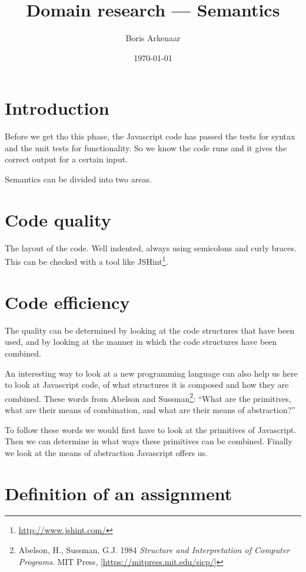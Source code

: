 \documentclass{article}
\begin{document}
 

\title{Domain research --- Semantics}
\author{Boris Arkenaar}
\date{\today}
\maketitle 

\section{Introduction} 

Before we get tho this phase, the Javascript code has passed the tests for
syntax and the unit tests for functionality. So we know the code runs and it
gives the correct output for a certain input.

Semantics can be divided into two areas.

\section{Code quality}

The layout of the code. Well indented, always using semicolons and curly
braces. This can be checked with a tool like
JSHint\footnote{\url{http://www.jshint.com/}}.

\section{Code efficiency}

The quality can be determined by looking at the code structures that have been
used, and by looking at the manner in which the code structures have been
combined.

An interesting way to look at a new programming language can also help us here
to look at Javascript code, of what structures it is composed and how they are
combined. These words from Abelson and Sussman\footnote{Abelson, H., Sussman,
G.J. 1984 {\em Structure and Interpretation of Computer Programs}. MIT Press,
[\url{https://mitpress.mit.edu/sicp/}]}: ``What are the primitives, what are
their means of combination, and what are their means of abstraction?''

To follow these words we would first have to look at the primitives of
Javascript. Then we can determine in what ways these primitives can be
combined. Finally we look at the means of abstraction Javascript offers us.

\section{Definition of an assignment}
\end{document}
